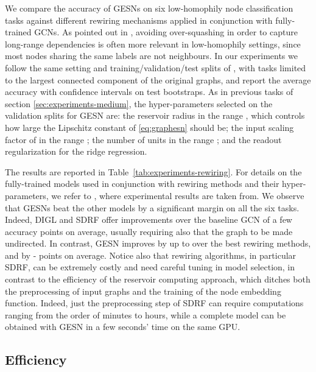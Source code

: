 \documentclass[final,5p,times,twocolumn]{elsarticle}
\begin{document}
We compare the accuracy of GESNs on six low-homophily node classification tasks against different rewiring mechanisms applied in conjunction with fully-trained GCNs.
As pointed out in \cite{Topping2022}, avoiding over-squashing in order to capture long-range dependencies is often more relevant in low-homophily settings, since most nodes sharing the same labels are not neighbours.
In our experiments we follow the same setting and training/validation/test splits of \cite{Gasteiger2019,Topping2022}, with tasks limited to the largest connected component of the original graphs, and report the average accuracy with  confidence intervals on  test bootstraps.
As in previous tasks of section \ref{sec:experiments-medium}, the hyper-parameters selected on the validation splits for GESN are: the reservoir radius  in the range , which controls how large the Lipschitz constant of \eqref{eq:graphesn} should be; the input scaling factor of  in the range ; the number of units  in the range ; and the readout regularization for the ridge regression.

The results are reported in Table~\ref{tab:experiments-rewiring}.
For details on the fully-trained models used in conjunction with rewiring methods and their hyper-parameters, we refer to \cite{Topping2022}, where experimental results are taken from.
We observe that GESNs beat the other models by a significant margin on all the six tasks.
Indeed, DIGL and SDRF offer improvements over the baseline GCN of a few accuracy points on average, usually requiring also that the graph to be made undirected.
In contrast, GESN improves by up to  over the best rewiring methods, and by - points on average.
Notice also that rewiring algorithms, in particular SDRF, can be extremely costly and need careful tuning in model selection, in contrast to the efficiency of the reservoir computing approach, which ditches both the preprocessing of input graphs and the training of the node embedding function.
Indeed, just the preprocessing step of SDRF can require computations ranging from the order of minutes to hours, while a complete model can be obtained with GESN in a few seconds' time on the same GPU.

\subsection{Efficiency}
\end{document}

